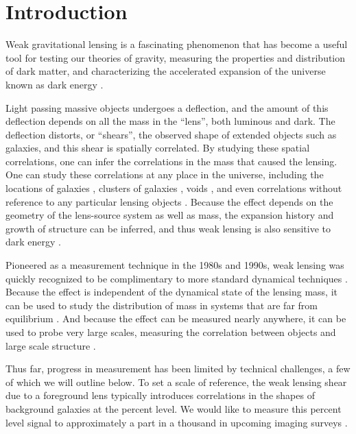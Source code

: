 \documentclass[iop, twocolappendix, appendixfloats, numberedappendix, apj]{emulateapj}
\begin{document}

\section{Introduction} \label{sec:intro}

Weak gravitational lensing is a fascinating phenomenon that has become a useful
tool for testing our theories of gravity, measuring the properties and
distribution of dark matter, and characterizing the accelerated expansion 
of the universe known as dark energy \citep[for a review, see][]{HoekstraJain2008}.

Light passing massive objects undergoes a deflection, and the amount of this
deflection depends on all the mass in the ``lens'', both luminous and dark.
The deflection distorts, or ``shears'', the observed shape of extended objects
such as galaxies, and this shear is spatially correlated.  By studying these
spatial correlations, one can infer the correlations in the mass that caused the
lensing. One can study these correlations at any place in the universe,
including the locations of galaxies \citep{Mandelbaum06}, clusters of galaxies
\citep{JohnstonLensing07}, voids \citep{MelchiorVoids2014}, and even
correlations without reference to any particular lensing objects
\citep{CFHTCosmicShear2013}.  Because the effect depends on the geometry of the
lens-source system as well as mass, the expansion history and growth of
structure can be inferred, and thus weak lensing is also sensitive to dark
energy \citep{HeymansTomography2013}.


Pioneered as a measurement technique in the 1980s and 1990s, weak lensing was
quickly recognized to be complimentary to more standard dynamical techniques
\citep{Tyson84}.  Because the effect is independent of the dynamical state of
the lensing mass, it can be used to study the distribution of mass in systems
that are far from equilibrium \citep{CloweDMProof06}.   And because the effect
can be measured nearly anywhere, it can be used to probe very large scales,
measuring the correlation between objects and large scale structure
\citep{SheldonLensing09}.

Thus far, progress in measurement has been limited by technical challenges, a
few of which we will outline below.  To set a scale of reference, the weak
lensing shear due to a foreground lens typically introduces correlations in the
shapes of background galaxies at the percent level.    We would like to measure
this percent level signal to approximately a part in a thousand in upcoming
imaging surveys \citep{HutererSystematics06}.
\end{document}
